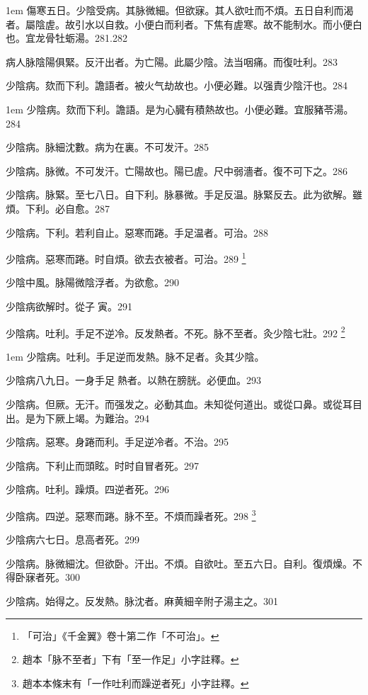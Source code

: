 \hangindent 1em
傷寒五日。少陰受病。其脉微細。但欲寐。其人欲吐而不煩。五日自利而渴者。屬陰虗。故引水以自救。小便白而利者。下焦有虗寒。故不能制水。而小便白也。宜龙骨牡蛎湯。{\shenghui}281.282

病人脉陰陽俱緊。反汗出者。为亡陽。此屬少陰。法当咽痛。而復吐利。283

少陰病。欬而下利。譫語者。被火气劫故也。小便必難。以强責少陰汗也。284

\hangindent 1em
少陰病。欬而下利。譫語。是为心臓有積熱故也。小便必難。宜服豬苓湯。{\shenghui}284

少陰病。脉細沈數。病为在裏。不可发汗。285

少陰病。脉微。不可发汗。亡陽故也。陽已虗。尺中弱濇者。復不可下之。286

少陰病。脉緊。至七八日。{\khaai 自}下利。脉暴微。手足反温。脉緊反去。此为欲解。雖煩。下利。必自愈。287

少陰病。下利。若利{\khaai 自}止。惡寒而踡。手足温者。可治。288

少陰病。惡寒而踡。时自煩。欲去衣被者。可治。289
	\footnote{
		「可治」《千金翼》卷十第二作「不可治」。
	}

少陰中風。脉陽微陰浮者。为欲愈。290

少陰病欲解时。從子{\sungii 𥁞}寅。291

少陰病。吐利。手足不逆{\khaai 冷}。反发熱者。不死。脉不至者。灸少陰七壯。292
	\footnote{
		趙本「脉不至者」下有「至一作足」小字註釋。
	}

\hangindent 1em
少陰病。吐利。手足逆而发熱。脉不足者。灸其少陰。{\shenghui}

少陰病八九日。一身手足{\sungii 𥁞}熱者。以熱在膀胱。必便血。293

少陰病。但厥。无汗。而强发之。必動其血。未知從何道出。或從口鼻。或從{\khaai 耳}目出。是为下厥上竭。为難治。294

少陰病。惡寒。身踡而利。手足逆{\khaai 冷}者。不治。295

少陰病。下利止而頭眩。时时自冒者死。297

少陰病。吐利。躁煩。四逆者死。296

少陰病。四逆。惡寒而踡。脉不至。不煩而躁者死。298
	\footnote{
		趙本本條末有「一作吐利而躁逆者死」小字註釋。
	}

少陰病六七日。息高者死。299

少陰病。脉微細沈。但欲卧。汗出。不煩。自欲吐。{\khaai 至}五六日。自利。復煩燥。不得卧寐者死。300

少陰病。始得之。反发熱。脉沈者。麻黄細辛附子湯主之。301

